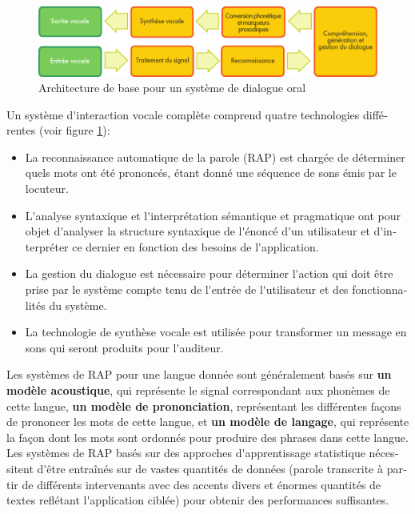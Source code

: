 \begin{french}
\begin{multicols}{2}
\begin{figure}[!ht]
\begin{center}
 \includegraphics[width=\textwidth]{../_media/french/simple_speech-based_dialogue_architecture} 
\caption{Architecture de base pour un système de dialogue oral}
\label{fig:slds}
\end{center}
\end{figure}

Un système d{\mbox '}interaction vocale complète comprend quatre technologies
différentes (voir figure \ref{fig:slds}):
\begin{itemize}
\item La reconnaissance automatique de la parole (RAP) est chargée de
  déterminer quels mots ont été prononcés, étant donné une
  séquence de sons émis par le locuteur.
\item L{\mbox '}analyse syntaxique et l{\mbox '}interprétation sémantique et
  pragmatique ont pour objet d{\mbox '}analyser la structure syntaxique de
  l{\mbox '}énoncé d{\mbox '}un utilisateur et d{\mbox '}interpréter ce dernier en fonction
  des besoins de l{\mbox '}application.
\item La gestion du dialogue est nécessaire pour déterminer l{\mbox '}action
  qui doit être prise par le système compte tenu de l{\mbox '}entrée de
  l{\mbox '}utilisateur et des fonctionnalités du système.
\item La technologie de synthèse vocale est utilisée pour transformer
  un message en sons qui seront produits pour l{\mbox '}auditeur.
\end{itemize}

Les systèmes de RAP pour une langue donnée sont généralement basés sur
{\bf un modèle acoustique}, qui représente le signal correspondant aux
phonèmes de cette langue, {\bf un modèle de prononciation},
représentant les différentes façons de prononcer les mots de cette
langue, et {\bf un modèle de langage}, qui représente la façon dont
les mots sont ordonnés pour produire des phrases dans cette
langue. Les systèmes de RAP basés sur des approches d{\mbox
  '}apprentissage statistique nécessitent d{\mbox '}être entraînés sur
de vastes quantités de données (parole transcrite à partir de
différents intervenants avec des accents divers et énormes quantités
de textes reflétant l{\mbox '}application ciblée) pour obtenir des
performances suffisantes.


\end{multicols}
\end{french}
